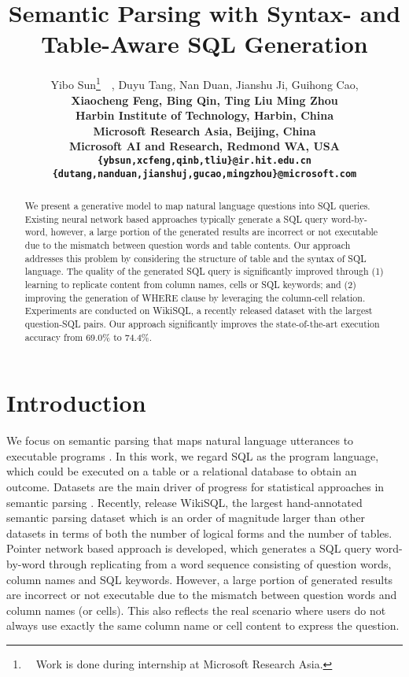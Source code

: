 \documentclass[11pt,a4paper]{article}
\title{Semantic Parsing with Syntax- and Table-Aware SQL Generation}
\author{Yibo Sun\thanks{\ \ Work is done during internship at Microsoft Research Asia.}\ \ , Duyu Tang, Nan Duan, Jianshu Ji, Guihong Cao,  \\
	\bf Xiaocheng Feng, Bing Qin, Ting Liu Ming Zhou \\
	Harbin Institute of Technology, Harbin, China\\
	Microsoft Research Asia, Beijing, China \\
	Microsoft AI and Research, Redmond WA, USA\\
	{\small \tt \{ybsun,xcfeng,qinb,tliu\}@ir.hit.edu.cn}\\
	{\small \tt \{dutang,nanduan,jianshuj,gucao,mingzhou\}@microsoft.com}}
\date{}
\begin{document}
	\maketitle
	
\begin{abstract}
We present a generative model to map natural language questions into SQL queries.
Existing neural network based approaches typically generate a SQL query word-by-word, however, a large portion of the generated results are incorrect or not executable due to the mismatch between question words and table contents.
Our approach addresses this problem by considering the structure of table and the syntax of SQL language.
The quality of the generated SQL query is significantly improved through (1) learning to replicate content from column names, cells or SQL keywords;
and (2) improving the generation of WHERE clause by leveraging the column-cell relation.
Experiments are conducted on WikiSQL, a recently released dataset with the largest question-SQL pairs.
Our approach significantly improves the state-of-the-art execution accuracy from 69.0\% to 74.4\%.
\end{abstract}








\section{Introduction}

We focus on semantic parsing that maps natural language utterances to executable \mbox{programs}
\cite{zelle1996learning,wong2007learning,zettlemoyer2007online,kwiatkowski2011lexical,pasupat-liang:2015:ACL-IJCNLP,iyer-EtAl:2017:Long,iyyer-yih-chang:2017:Long}.
In this work, we regard SQL as the program language, which could be executed on a table or a relational database to obtain an outcome.
Datasets are the main driver of progress for statistical approaches in semantic parsing \cite{liang2016learning}.
Recently,  release WikiSQL, the largest hand-annotated semantic parsing dataset which is an order of magnitude larger than other datasets in terms of both the number of logical forms and the number of tables.
Pointer network \cite{vinyals2015pointer} based approach is developed, which generates a SQL query word-by-word through replicating from a word sequence consisting of question words, column names and SQL keywords.
However, a large portion of generated results are incorrect or not executable due to the mismatch between question words and column names (or cells).
This also reflects the real scenario where users do not always use exactly the same column name or cell content to express the question.
\end{document}
